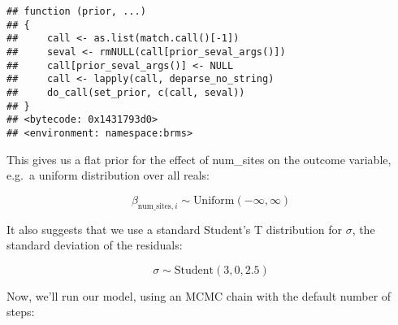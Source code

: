\documentclass[
]{article}
\begin{document}
\begin{verbatim}
## function (prior, ...) 
## {
##     call <- as.list(match.call()[-1])
##     seval <- rmNULL(call[prior_seval_args()])
##     call[prior_seval_args()] <- NULL
##     call <- lapply(call, deparse_no_string)
##     do_call(set_prior, c(call, seval))
## }
## <bytecode: 0x1431793d0>
## <environment: namespace:brms>
\end{verbatim}

This gives us a flat prior for the effect of num\_sites on the outcome
variable, e.g.~a uniform distribution over all reals:

\[
\beta_{\text{num_sites},i} \sim \text{Uniform}(-\infty,\infty)
\]

It also suggests that we use a standard Student's T distribution for
\(\sigma\), the standard deviation of the residuals:

\[
\sigma \sim \text{Student}(3, 0, 2.5)
\]

Now, we'll run our model, using an MCMC chain with the default number of
steps:
\end{document}

